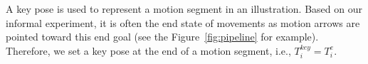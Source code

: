 %



A key pose is used to represent a motion segment in an illustration. Based on our informal experiment, it is often the end state of movements as motion arrows are pointed toward this end goal (see the Figure~\ref{fig:pipeline} for example). Therefore, we set a key pose at the end of a motion segment, i.e., $T_i^{key} = T_i^e$.

